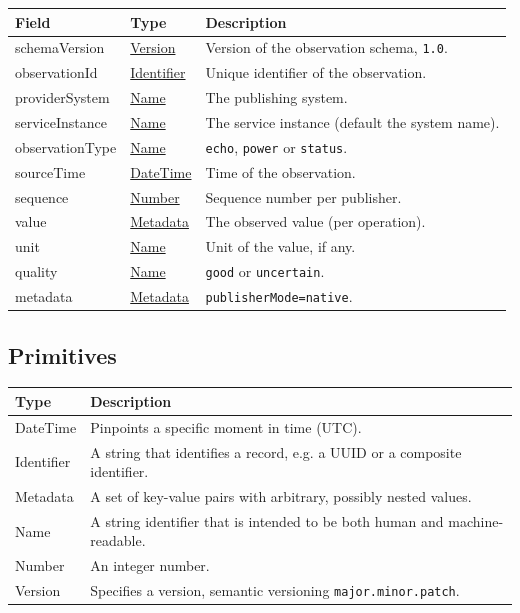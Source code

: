 \documentclass[a4paper]{arrowhead}
\newcommand{\pdef}[1]{{\textcolor{ArrowheadGrey}{#1\label{sec:model:primitives:#1}\label{sec:model:primitives:#1s}\label{sec:model:primitives:#1es}}}}
\newcommand{\pref}[1]{{\textcolor{ArrowheadGrey}{\hyperref[sec:model:primitives:#1]{#1}}}}
\begin{document}
\noindent\begin{tabularx}{\textwidth}{| p{4.25cm} | p{3.5cm} | X |} \hline
\rowcolor{gray!33} Field & Type & Description \\ \hline
schemaVersion & \pref{Version} & Version of the observation schema, \texttt{1.0}. \\ \hline
observationId & \pref{Identifier} & Unique identifier of the observation. \\ \hline
providerSystem & \pref{Name} & The publishing system. \\ \hline
serviceInstance & \pref{Name} & The service instance (default the system name). \\ \hline
observationType & \pref{Name} & \texttt{echo}, \texttt{power} or \texttt{status}. \\ \hline
sourceTime & \pref{DateTime} & Time of the observation. \\ \hline
sequence & \pref{Number} & Sequence number per publisher. \\ \hline
value & \pref{Metadata} & The observed value (per operation). \\ \hline
unit & \pref{Name} & Unit of the value, if any. \\ \hline
quality & \pref{Name} & \texttt{good} or \texttt{uncertain}. \\ \hline
metadata & \pref{Metadata} & \texttt{publisherMode=native}. \\ \hline
\end{tabularx}

\subsection{Primitives}
\label{sec:model:primitives}

\noindent\begin{tabularx}{\textwidth}{| p{3cm} | X |} \hline
\rowcolor{gray!33} Type & Description \\ \hline
\pdef{DateTime} & Pinpoints a specific moment in time (UTC). \\ \hline
\pdef{Identifier} & A string that identifies a record, e.g. a UUID or a composite identifier. \\ \hline
\pdef{Metadata} & A set of key-value pairs with arbitrary, possibly nested values. \\ \hline
\pdef{Name} & A string identifier that is intended to be both human and machine-readable. \\ \hline
\pdef{Number} & An integer number. \\ \hline
\pdef{Version} & Specifies a version, semantic versioning \texttt{major.minor.patch}. \\ \hline
\end{tabularx}
\end{document}

